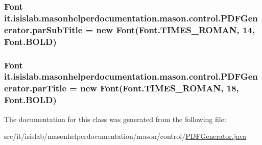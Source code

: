\hypertarget{classit_1_1isislab_1_1masonhelperdocumentation_1_1mason_1_1control_1_1_p_d_f_generator_ac4f2d6c81c14b60dcddfc358b9296ee5}{
\subsubsection[{par\-Sub\-Title}]{\setlength{\rightskip}{0pt plus 5cm}Font it.\-isislab.\-masonhelperdocumentation.\-mason.\-control.\-P\-D\-F\-Generator.\-par\-Sub\-Title = new Font(Font.\-T\-I\-M\-E\-S\-\_\-\-R\-O\-M\-A\-N, 14, Font.\-B\-O\-L\-D)\hspace{0.3cm}{\ttfamily [private]}}}\label{classit_1_1isislab_1_1masonhelperdocumentation_1_1mason_1_1control_1_1_p_d_f_generator_ac4f2d6c81c14b60dcddfc358b9296ee5}
\hypertarget{classit_1_1isislab_1_1masonhelperdocumentation_1_1mason_1_1control_1_1_p_d_f_generator_a74f4e5e2095668aa762c3c3df4325c74}{
\subsubsection[{par\-Title}]{\setlength{\rightskip}{0pt plus 5cm}Font it.\-isislab.\-masonhelperdocumentation.\-mason.\-control.\-P\-D\-F\-Generator.\-par\-Title = new Font(Font.\-T\-I\-M\-E\-S\-\_\-\-R\-O\-M\-A\-N, 18, Font.\-B\-O\-L\-D)\hspace{0.3cm}{\ttfamily [private]}}}\label{classit_1_1isislab_1_1masonhelperdocumentation_1_1mason_1_1control_1_1_p_d_f_generator_a74f4e5e2095668aa762c3c3df4325c74}


The documentation for this class was generated from the following file\-:\begin{DoxyCompactItemize}
\item 
src/it/isislab/masonhelperdocumentation/mason/control/\hyperlink{_p_d_f_generator_8java}{P\-D\-F\-Generator.\-java}\end{DoxyCompactItemize}
